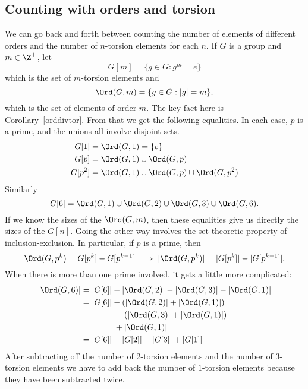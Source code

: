 \documentclass[12pt]{amsart}
\theoremstyle{plain}
\theoremstyle{definition}
\theoremstyle{remark}
\begin{document}
\subsection{Counting with orders and torsion}
We can go back and forth between counting the number of elements of different
orders and the number of $n$-torsion elements for each $n$.  If $G$ is a group
and $m\in\Z^+$,
let
\[ G[m] = \{g\in G : g^m=e\}\]
which is the set of $m$-torsion elements and
\[ \Ord(G,m) = \{g\in G : |g|=m\},\]
which is the set of elements of order $m$.  The key fact here is
Corollary~\ref{orddivtor}.  From that we get the following equalities.
In each case, $p$ is a prime, and the unions all involve disjoint sets.
\begin{align*}
G[1] &= \Ord(G,1) = \{e\} \\
G[p] &= \Ord(G,1) \cup \Ord(G,p) \\
G[p^2] & = \Ord(G,1) \cup \Ord(G,p) \cup \Ord(G,p^2)
\end{align*}
Similarly
\[ G[6] = \Ord(G,1)\cup \Ord(G,2)\cup\Ord(G,3) \cup\Ord(G,6).\]
If we know the sizes of the $\Ord(G,m)$, then these equalities give us
directly the sizes of the $G[n]$.  Going the other way involves the
set theoretic property of inclusion-exclusion.  In particular, if $p$ is a
prime, then
\[ \Ord(G,p^k) = G[p^k] - G[p^{k-1}] \implies |\Ord(G,p^k)| = |G[p^k]|-|G[p^{k-1}]|.\]
When there is more than one prime involved, it gets a little more complicated:
\begin{align*}
 |\Ord(G,6)| &= |G[6]| - |\Ord(G,2)| - |\Ord(G,3)| - |\Ord(G,1)|  \\
 &= |G[6]| - (|\Ord(G,2)| + |\Ord(G,1)|)  \\
 & \qquad\qquad - (|\Ord(G,3)| + |\Ord(G,1)|) \\
 & \qquad\qquad + |\Ord(G,1)|  \\
&= |G[6]| - |G[2]| - |G[3]| + |G[1]|
\end{align*}
After subtracting off the number of $2$-torsion elements and the number of $3$-torsion 
elements we have to add back the number of $1$-torsion elements because they have been
subtracted twice.
\end{document}
